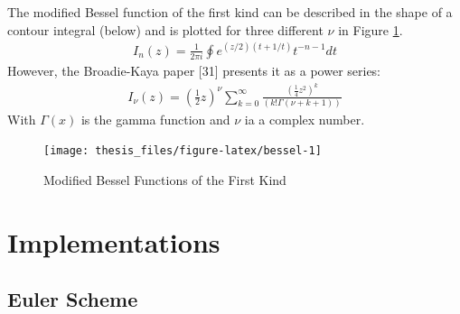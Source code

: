 \documentclass[12pt,oneside]{reedthesis}
\theoremstyle{definition}
\theoremstyle{definition}
\theoremstyle{remark}
\begin{document}
  The modified Bessel function of the first kind can be described in the
  shape of a contour integral (below) and is plotted for three different
  \(\nu\) in Figure \ref{fig:bessel}.
  \begin{align*} 
  I_n(z)= \frac{1}{2 \pi i}\displaystyle \oint e^{(z/2)(t+1/t)}t^{-n-1}dt
  \end{align*}
  However, the Broadie-Kaya paper {[}31{]} presents it as a power series:
  \begin{align*}
  I_{\nu}(z)= \left(\frac{1}{2}z\right)^\nu \displaystyle \sum_{k=0}^{\infty}{\frac{\left(\frac{1}{4}z^2\right)^k}{\left(k!\Gamma \left(\nu+k+1\right)\right)}}
  \end{align*}
  With \(\Gamma(x)\) is the gamma function and \(\nu\) ia a complex
  number.
  \begin{figure}
  
  {\centering \texttt{[image: thesis\_files/figure-latex/bessel-1]} 
  
  }
  
  \caption{Modified Bessel Functions of the First Kind \label{bessel}}\label{fig:bessel}
  \end{figure}
  \chapter{Implementations}\label{imps}
  
  \section{Euler Scheme}\label{eulerapp}
  
\end{document}
